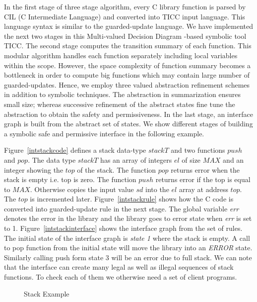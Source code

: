 \documentclass{llncs}
\begin{document}
In the first stage of three stage algorithm, every C library function is parsed by CIL (C Intermediate Language)\cite{CIL} and converted into TICC \cite{TICC-tool} input language.
This language syntax is similar to the guarded-update language.
We have implemented the next two stages in this Multi-valued Decision Diagram \cite{MDD90}-based symbolic tool TICC.  
The second stage computes the transition summary of each function. 
This modular algorithm handles each function separately including local variables within the scope.
However,  the space complexity of function summary becomes a bottleneck in order to compute big functions which may contain large number of guarded-updates. 
Hence, we employ  three valued abstraction refinement schemes in addition to symbolic techniques.
The abstraction in summarization ensures small size; whereas successive refinement of the 
abstract states fine tune the abstraction to obtain the safety and permissiveness.
In the last stage, an interface graph is built from the abstract set of states. We show different
stages of building a symbolic safe and permissive interface in the following example. 
\begin{example}
Figure~\ref{intstackcode} defines a stack data-type $stackT$ and two functions $push$ and $pop$.
The data type $stackT$ has an array of integers $el$ of size $MAX$ and an integer showing the $top$
of the stack. 
The function $pop$ returns error when the stack is empty i.e. top is zero. The function $push$
returns error if the top is equal to $MAX$. 
Otherwise copies the input value $sd$ into the $el$ array at address $top$. 
The $top$ is incremented later.
Figure~\ref{intstackrule} shows how the C code is converted into guarded-update rule in the next stage.
The global variable {\em err} denotes the error in the library and the library goes to error state
when {\em err} is set to 1.
Figure~\ref{intstackinterface} shows the interface graph from the set of rules.
The initial state of the interface graph is {\em state 1} where the stack is empty.
A call to pop function from the initial state will move the library into an {\em ERROR} state.
Similarly calling push form state $3$ will be an error due to full stack. 
We can note that the interface can create many legal as well as illegal sequences of stack functions. 
To check each of them we otherwise need a set of client programs.
\begin{figure}[htb]
\centering
{}
\caption{Stack Example}\label{intstack}
\end{figure}
\end{example}
\end{document}
